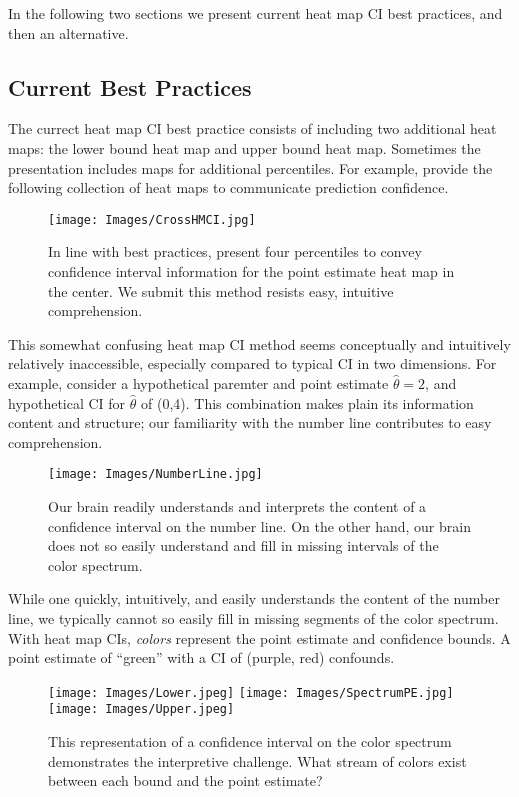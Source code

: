 In the following two sections we present current heat map CI best practices, and then an alternative.

\subsection{Current Best Practices}

The currect heat map CI best practice consists of including two additional heat maps: the lower bound heat map and upper bound heat map. Sometimes the presentation includes maps for additional percentiles. For example, \cite{Cross2015} provide the following collection of heat maps to communicate prediction confidence.
  \begin{figure}[H]
	\texttt{[image: Images/CrossHMCI.jpg]}
	\caption{In line with best practices, \cite{Cross2015} present four percentiles to convey confidence interval information for the point estimate heat map in the center. We submit this method resists easy, intuitive comprehension.}
	\end{figure}
This somewhat confusing heat map CI method seems conceptually and intuitively relatively inaccessible, especially compared to typical CI in two dimensions. For example, consider a hypothetical paremter and point estimate $\hat{\theta} = 2$, and hypothetical CI for $\hat{\theta}$ of (0,4). This combination makes plain its information content and structure; our familiarity with the number line contributes to easy comprehension.
  \begin{figure}[H]
  \centering
	\texttt{[image: Images/NumberLine.jpg]}
	\caption{Our brain readily understands and interprets the content of a confidence interval on the number line. On the other hand, our brain does not so easily understand and fill in missing intervals of the color spectrum.}
	\end{figure}
While one quickly, intuitively, and easily understands the content of the number line, we typically cannot so easily fill in missing segments of the color spectrum. With heat map CIs, {\it colors} represent the point estimate and confidence bounds. A point estimate of ``green'' with a CI of (purple, red) confounds.
  \begin{figure}[H]
  \centering
	\texttt{[image: Images/Lower.jpeg]}
	\texttt{[image: Images/SpectrumPE.jpg]}
	\texttt{[image: Images/Upper.jpeg]}
	\caption{This representation of a confidence interval on the color spectrum demonstrates the interpretive challenge. What stream of colors exist between each bound and the point estimate?}
	\end{figure}
